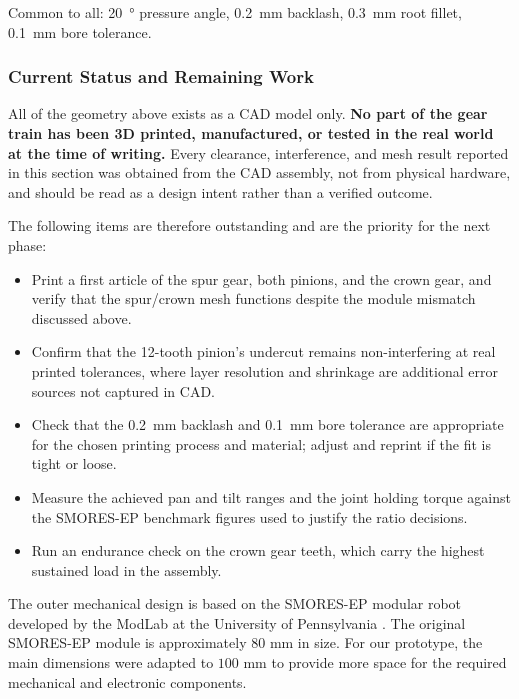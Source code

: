 \documentclass[12pt,a4paper]{article}
\begin{document}
Common to all: \SI{20}{\degree} pressure angle, \SI{0.2}{\milli\metre} backlash,
\SI{0.3}{\milli\metre} root fillet, \SI{0.1}{\milli\metre} bore tolerance.

\subsubsection{Current Status and Remaining Work}

All of the geometry above exists as a CAD model only. \textbf{No part of the
gear train has been 3D printed, manufactured, or tested in the real world at the
time of writing.} Every clearance, interference, and mesh result reported in
this section was obtained from the CAD assembly, not from physical hardware, and
should be read as a design intent rather than a verified outcome.

The following items are therefore outstanding and are the priority for the next
phase:
\begin{itemize}
	\item Print a first article of the spur gear, both pinions, and the crown
	      gear, and verify that the spur/crown mesh functions despite the
	      module mismatch discussed above.
	\item Confirm that the 12-tooth pinion's undercut remains non-interfering at
	      real printed tolerances, where layer resolution and shrinkage are
	      additional error sources not captured in CAD.
	\item Check that the \SI{0.2}{\milli\metre} backlash and
	      \SI{0.1}{\milli\metre} bore tolerance are appropriate for the chosen
	      printing process and material; adjust and reprint if the fit is tight
	      or loose.
	\item Measure the achieved pan and tilt ranges and the joint holding torque
	      against the SMORES-EP benchmark figures used to justify the ratio
	      decisions.
	\item Run an endurance check on the crown gear teeth, which carry the
	      highest sustained load in the assembly.
\end{itemize}

The outer mechanical design is based on the SMORES-EP modular robot developed by the ModLab at the University of Pennsylvania \cite{smores_ep}. The original SMORES-EP module is approximately \(80\) mm in size. For our prototype, the main dimensions were adapted to \(100\) mm to provide more space for the required mechanical and electronic components.
\end{document}
